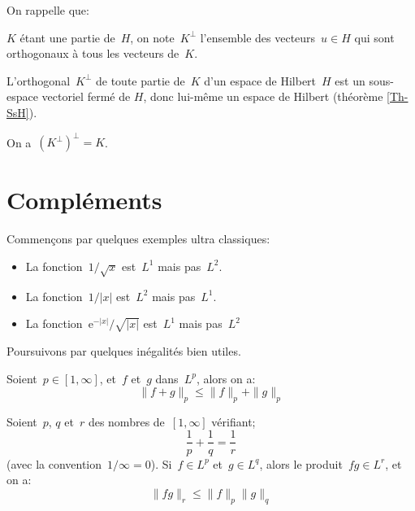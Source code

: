 On rappelle que:
\begin{definition}
$K$ étant une partie de~$H$, on note~$K^\bot$ l'ensemble des vecteurs~$u\in H$ qui sont orthogonaux à tous les
vecteurs de~$K$.
\end{definition}

\begin{theoreme}
L'orthogonal~$K^\bot$ de toute partie de~$K$ d'un espace de Hilbert~$H$ est un sous-espace vectoriel fermé de $H$, donc lui-même un espace de Hilbert (théorème \ref{Th-SsH}).

On a~$(K^\bot)^\bot = K$.
\end{theoreme}

\medskip
\section{Compléments}

Commençons par quelques exemples ultra classiques:
\begin{itemize}
  \item La fonction~$1/\sqrt{x}$ est~$L^1$ mais pas~$L^2$.
  \item La fonction~$1/|x|$ est~$L^2$ mais pas~$L^1$.
  \item La fonction~$\mathrm{e}^{-|x|}/\sqrt{|x|}$ est~$L^1$ mais pas~$L^2$
\end{itemize}

\medskip
Poursuivons par quelques inégalités bien utiles.

\begin{theoreme}
Soient~$p\in[1,\infty]$, et~$f$ et~$g$ dans~$L^p$, alors on a:
\begin{equation}\|f+g\|_p\le\|f\|_p+\|g\|_p\end{equation}
\end{theoreme}

\begin{theoreme}
Soient~$p$, $q$ et~$r$ des nombres de~$[1,\infty]$ vérifiant;
\begin{equation}\dfrac1p+\dfrac1q=\dfrac1r\end{equation} (avec la convention~$1/\infty=0$).
Si~$f\in L^p$ et~$g\in L^q$, alors le produit~$fg\in L^r$, et on a:
\begin{equation}\|fg\|_r\le\|f\|_p\|g\|_q\end{equation}
\end{theoreme}

